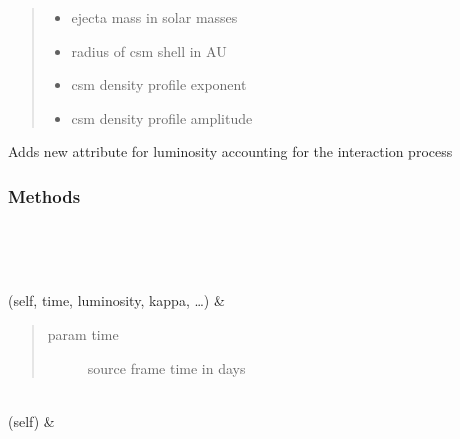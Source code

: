 \documentclass[letterpaper,10pt,english]{sphinxmanual}
\begin{document}
\begin{fulllineitems}
\begin{fulllineitems}
\begin{quote}
\begin{description}
\begin{itemize}
\item {} 
 \textendash{} ejecta mass in solar masses

\item {} 
 \textendash{} radius of csm shell in AU

\item {} 
 \textendash{} csm density profile exponent

\item {} 
 \textendash{} csm density profile amplitude

\end{itemize}

\end{description}\end{quote}

Adds new attribute for luminosity accounting for the interaction process

\end{fulllineitems}

\subsubsection*{Methods}


\begin{savenotes}\sphinxatlongtablestart\begin{longtable}[c]{}
\hline

\endfirsthead

%
{}\\
\hline

\endhead

\hline
{}\\
\endfoot

\endlastfoot

{\hyperref[\detokenize{generated/sdapy.interaction_processes.CSMDiffusion:sdapy.interaction_processes.CSMDiffusion.__init__}]{}}(self, time, luminosity, kappa, …)
&
\begin{quote}\begin{description}
\item[{param time}] \leavevmode
source frame time in days

\end{description}\end{quote}

\\
\hline
{}(self)
&

\\
\hline
\end{longtable}\sphinxatlongtableend\end{savenotes}

\end{fulllineitems}
\end{document}
